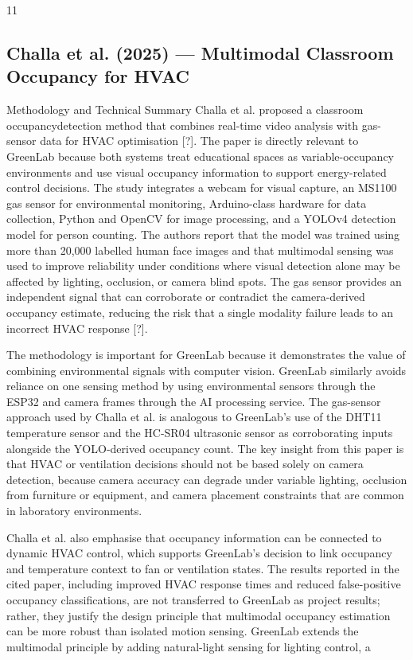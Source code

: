 11



\subsection{Challa et al. (2025) --- Multimodal Classroom Occupancy for HVAC}


Methodology and Technical Summary Challa et al. proposed a classroom occupancydetection method that combines real-time video analysis with gas-sensor data for HVAC
optimisation [?]. The paper is directly relevant to GreenLab because both systems treat
educational spaces as variable-occupancy environments and use visual occupancy information to support energy-related control decisions. The study integrates a webcam for visual
capture, an MS1100 gas sensor for environmental monitoring, Arduino-class hardware for
data collection, Python and OpenCV for image processing, and a YOLOv4 detection model
for person counting. The authors report that the model was trained using more than 20,000
labelled human face images and that multimodal sensing was used to improve reliability
under conditions where visual detection alone may be affected by lighting, occlusion, or
camera blind spots. The gas sensor provides an independent signal that can corroborate or
contradict the camera-derived occupancy estimate, reducing the risk that a single modality
failure leads to an incorrect HVAC response [?].

The methodology is important for GreenLab because it demonstrates the value of combining environmental signals with computer vision. GreenLab similarly avoids reliance on
one sensing method by using environmental sensors through the ESP32 and camera frames
through the AI processing service. The gas-sensor approach used by Challa et al. is analogous to GreenLab's use of the DHT11 temperature sensor and the HC-SR04 ultrasonic
sensor as corroborating inputs alongside the YOLO-derived occupancy count. The key insight from this paper is that HVAC or ventilation decisions should not be based solely on
camera detection, because camera accuracy can degrade under variable lighting, occlusion
from furniture or equipment, and camera placement constraints that are common in laboratory environments.

Challa et al. also emphasise that occupancy information can be connected to dynamic
HVAC control, which supports GreenLab's decision to link occupancy and temperature
context to fan or ventilation states. The results reported in the cited paper, including improved HVAC response times and reduced false-positive occupancy classiﬁcations, are not
transferred to GreenLab as project results; rather, they justify the design principle that multimodal occupancy estimation can be more robust than isolated motion sensing. GreenLab
extends the multimodal principle by adding natural-light sensing for lighting control, a

